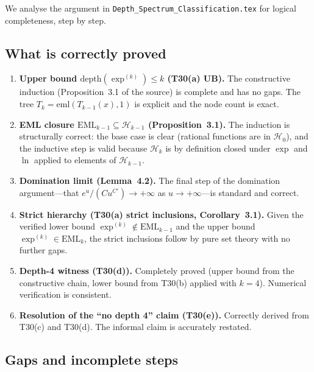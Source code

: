 \documentclass[12pt,a4paper]{article}
\theoremstyle{definition}
\theoremstyle{remark}
\begin{document}
We analyse the argument in \texttt{Depth\_Spectrum\_Classification.tex}
for logical completeness, step by step.

\subsection{What is correctly proved}

\begin{enumerate}
  \item \textbf{Upper bound $\mathrm{depth}(\exp^{(k)})\leq k$ (T30(a) UB).}
        The constructive induction (Proposition~3.1 of the source) is
        complete and has no gaps.  The tree $T_k=\mathrm{eml}(T_{k-1}(x),1)$
        is explicit and the node count is exact.

  \item \textbf{EML closure $\mathrm{EML}_{k-1}\subseteq\mathcal{H}_{k-1}$
        (Proposition~3.1).}  The induction is structurally correct: the
        base case is clear (rational functions are in $\mathcal{H}_0$),
        and the inductive step is valid because $\mathcal{H}_k$ is by
        definition closed under $\exp$ and $\ln$ applied to elements of
        $\mathcal{H}_{k-1}$.

  \item \textbf{Domination limit (Lemma~4.2).}
        The final step of the domination argument---that $e^u/(Cu^{C'})\to+\infty$
        as $u\to+\infty$---is standard and correct.

  \item \textbf{Strict hierarchy (T30(a) strict inclusions, Corollary~3.1).}
        Given the verified lower bound $\exp^{(k)}\notin\mathrm{EML}_{k-1}$
        and the upper bound $\exp^{(k)}\in\mathrm{EML}_k$, the strict
        inclusions follow by pure set theory with no further gaps.

  \item \textbf{Depth-4 witness (T30(d)).}
        Completely proved (upper bound from the constructive chain, lower bound
        from T30(b) applied with $k=4$).  Numerical verification is consistent.

  \item \textbf{Resolution of the ``no depth 4'' claim (T30(e)).}
        Correctly derived from T30(c) and T30(d).  The informal claim is
        accurately restated.
\end{enumerate}

\subsection{Gaps and incomplete steps}
\end{document}
